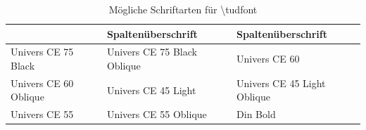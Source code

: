 \documentclass[a0paper,noDIN,MathematikA0]{tudmathposter}
\begin{document}
\begin{table}[h]
  \begin{farbtabellen}
    \begin{tabularx}{\linewidth}{|X|X|X|}
      \rowcolor{HKS41K60}\textbf{\color{white}\rule{0pt}{1em}Spaltenüberschrift}&\textbf{\color{white}Spaltenüberschrift}&\textbf{\color{white}Spaltenüberschrift}\\\hline
Univers CE 75 Black&
Univers CE 75 Black Oblique&
Univers CE 60\\
Univers CE 60 Oblique&
Univers CE 45 Light&
Univers CE 45 Light Oblique\\
Univers CE 55&
Univers CE 55 Oblique&
Din Bold
    \end{tabularx}
  \end{farbtabellen}

  \caption{Mögliche Schriftarten für \textbackslash tudfont}
  \label{tab:schriften}
\end{table}
\end{document}
